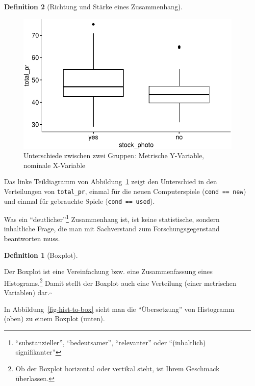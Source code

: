 \documentclass[
  a4paper,
  DIV=11]{scrreprt}
\theoremstyle{definition}
\theoremstyle{definition}
\theoremstyle{definition}
\newtheorem{definition}{Definition}[chapter]
\theoremstyle{remark}
\begin{document}
\begin{definition}[Richtung und Stärke eines
Zusammenhang]
\begin{figure}
\begin{minipage}{0.50\linewidth}
{\includegraphics{040-verbildlichen_files/figure-pdf/fig-compare-groups-2.pdf}

}


\end{minipage}%

\caption{\label{fig-compare-groups}Unterschiede zwischen zwei Gruppen:
Metrische Y-Variable, nominale X-Variable}

\end{figure}%

Das linke Teildiagramm von Abbildung~\ref{fig-compare-groups} zeigt den
Unterschied in den Verteilungen von \texttt{total\_pr}, einmal für die
neuen Computerspiele (\texttt{cond\ ==\ new}) und einmal für gebrauchte
Spiele (\texttt{cond\ ==\ used}).

Was ein ``deutlicher''\footnote{``substanzieller'', ``bedeutsamer'',
  ``relevanter'' oder ``(inhaltlich) signifikanter''} Zusammenhang ist,
ist keine statistische, sondern inhaltliche Frage, die man mit
Sachverstand zum Forschungsgegenstand beantworten muss.

\begin{definition}[Boxplot]\protect\hypertarget{def-boxplot}{}\label{def-boxplot}

Der Boxplot ist eine Vereinfachung bzw. eine Zusammenfassung eines
Histograms.\footnote{Ob der Boxplot horizontal oder vertikal steht, ist
  Ihrem Geschmack überlassen.} Damit stellt der Boxplot auch eine
Verteilung (einer metrischen Variablen) dar.\(\square\)

\end{definition}

In Abbildung~\ref{fig-hist-to-box} sieht man die ``Übersetzung'' von
Histogramm (oben) zu einem Boxplot (unten).


\end{definition}
\end{document}
